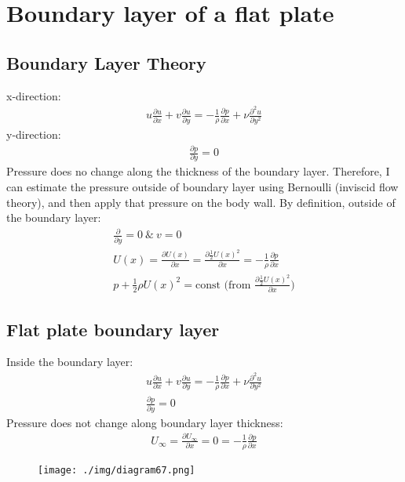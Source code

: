 \chapter{Boundary layer of a flat plate}
\section{Boundary Layer Theory}
x-direction:
\begin{align}
  u \frac{\partial u}{\partial x} + v \frac{\partial u}{\partial y} = - \frac{1}{\rho} \frac{\partial p}{\partial x} + \nu \frac{\partial^2 u}{\partial y^2}
\end{align}
y-direction:
\begin{align}
  \frac{\partial p}{\partial y} = 0
\end{align}
Pressure does no change along the thickness of the boundary layer. Therefore, I can estimate the pressure outside of boundary layer using Bernoulli (inviscid flow theory), and then apply that pressure on the body wall. By definition, outside of the boundary layer:
\begin{gather}
  \frac{\partial}{\partial y} = 0 \ \& \ v = 0\\
  U(x) = \frac{\partial U(x)}{\partial x} = \frac{\partial \frac{1}{2} U(x)^2}{\partial x} = - \frac{1}{\rho} \frac{\partial p}{\partial x}\\
  p + \frac{1}{2} \rho U(x)^2 = \textrm{const (from } \frac{\partial \frac{1}{2} U(x)^2}{\partial x}\textrm{)}
\end{gather}
\section{Flat plate boundary layer}
Inside the boundary layer:
\begin{align}
  u \frac{\partial u}{\partial x} + v\frac{\partial u}{\partial y} = -\frac{1}{\rho} \frac{\partial p}{\partial x} + \nu \frac{\partial^2 u}{\partial y^2} \\
  \frac{\partial p}{\partial y} = 0
\end{align}
Pressure does not change along boundary layer thickness:
\begin{align}
  U_\infty = \frac{\partial U_\infty}{\partial x} = 0 = -\frac{1}{\rho} \frac{\partial p}{\partial x}
\end{align}
\begin{figure}[H]
  \centering
  \texttt{[image: ./img/diagram67.png]}
  \caption{}
\end{figure}
